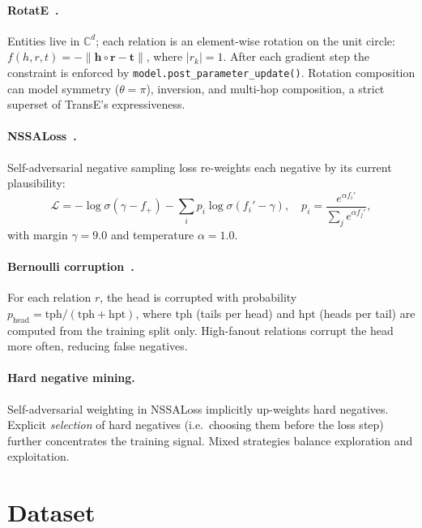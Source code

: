\documentclass[10pt,twocolumn,letterpaper]{article}
\begin{document}
\paragraph{RotatE~\cite{sun2019rotate}.}
Entities live in $\mathbb{C}^d$; each relation is an element-wise rotation on
the unit circle: $f(h,r,t)=-\|\mathbf{h}\circ\mathbf{r}-\mathbf{t}\|$, where
$|r_k|=1$. After each gradient step the constraint is enforced by
\texttt{model.post\_parameter\_update()}.
Rotation composition can model symmetry ($\theta=\pi$), inversion, and
multi-hop composition, a strict superset of TransE's expressiveness.

\paragraph{NSSALoss~\cite{sun2019rotate}.}
Self-adversarial negative sampling loss re-weights each negative by its
current plausibility:
\begin{equation}
\mathcal{L} = -\log\sigma(\gamma - f_+)
             - \textstyle\sum_i p_i \log\sigma(f_i' - \gamma),
\quad
p_i = \frac{e^{\alpha f_i'}}{\sum_j e^{\alpha f_j'}},
\label{eq:nssa}
\end{equation}
with margin $\gamma=9.0$ and temperature $\alpha=1.0$.

\paragraph{Bernoulli corruption~\cite{wang2014knowledge}.}
For each relation $r$, the head is corrupted with probability
$p_{\mathrm{head}} = \mathrm{tph}/(\mathrm{tph}+\mathrm{hpt})$,
where $\mathrm{tph}$ (tails per head) and $\mathrm{hpt}$ (heads per tail)
are computed from the training split only.
High-fanout relations corrupt the head more often, reducing false negatives.

\paragraph{Hard negative mining.}
Self-adversarial weighting in NSSALoss implicitly up-weights hard negatives.
Explicit \emph{selection} of hard negatives (i.e.\ choosing them before the
loss step) further concentrates the training signal. Mixed
strategies balance exploration and exploitation.

\section{Dataset}
\label{sec:dataset}
\end{document}

